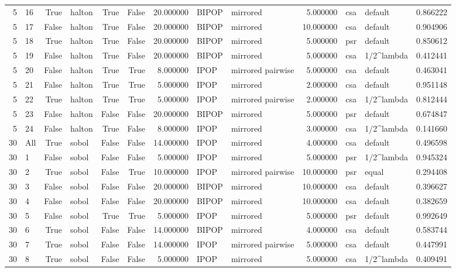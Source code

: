 \begin{tabular}{rlrlrrrllrllr}
5 & 16 & True & halton & True & False & 20.000000 & BIPOP & mirrored & 5.000000 & csa & default & 0.866222 \\
5 & 17 & False & halton & True & False & 20.000000 & BIPOP & mirrored & 10.000000 & csa & default & 0.904906 \\
5 & 18 & True & halton & True & False & 20.000000 & BIPOP & mirrored & 5.000000 & psr & default & 0.850612 \\
5 & 19 & False & halton & True & False & 20.000000 & BIPOP & mirrored & 5.000000 & csa & 1/2^lambda & 0.412441 \\
5 & 20 & False & halton & True & True & 8.000000 & IPOP & mirrored pairwise & 5.000000 & csa & default & 0.463041 \\
5 & 21 & False & halton & True & True & 5.000000 & IPOP & mirrored & 2.000000 & csa & default & 0.951148 \\
5 & 22 & True & halton & True & True & 5.000000 & IPOP & mirrored pairwise & 2.000000 & csa & 1/2^lambda & 0.812444 \\
5 & 23 & False & halton & False & False & 20.000000 & BIPOP & mirrored & 5.000000 & psr & default & 0.674847 \\
5 & 24 & False & halton & True & False & 8.000000 & IPOP & mirrored & 3.000000 & csa & 1/2^lambda & 0.141660 \\
30 & All & True & sobol & False & False & 14.000000 & IPOP & mirrored & 4.000000 & csa & default & 0.496598 \\
30 & 1 & False & sobol & False & False & 5.000000 & IPOP & mirrored & 5.000000 & psr & 1/2^lambda & 0.945324 \\
30 & 2 & True & sobol & False & True & 10.000000 & IPOP & mirrored pairwise & 10.000000 & psr & equal & 0.294408 \\
30 & 3 & False & sobol & False & False & 20.000000 & BIPOP & mirrored & 10.000000 & csa & default & 0.396627 \\
30 & 4 & False & sobol & False & False & 20.000000 & BIPOP & mirrored & 10.000000 & csa & default & 0.382659 \\
30 & 5 & False & sobol & True & True & 5.000000 & IPOP & mirrored & 5.000000 & psr & default & 0.992649 \\
30 & 6 & True & sobol & False & False & 14.000000 & BIPOP & mirrored & 4.000000 & csa & default & 0.583744 \\
30 & 7 & True & sobol & False & False & 14.000000 & IPOP & mirrored pairwise & 5.000000 & csa & default & 0.447991 \\
30 & 8 & True & sobol & False & False & 5.000000 & IPOP & mirrored & 5.000000 & csa & 1/2^lambda & 0.409491 \\

\end{tabular}
